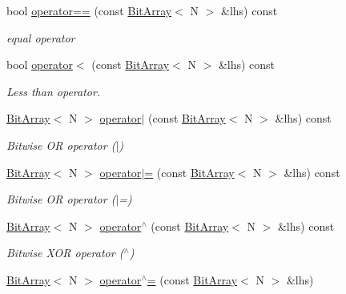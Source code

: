 \begin{DoxyCompactItemize}
bool \mbox{\hyperlink{classforte_1_1_bit_array_abe6a395fc267c35a66224344a43f2cb2}{operator==}} (const \mbox{\hyperlink{classforte_1_1_bit_array}{Bit\+Array}}$<$ N $>$ \&lhs) const
\begin{DoxyCompactList}\small\item\em equal operator \end{DoxyCompactList}\item 
bool \mbox{\hyperlink{classforte_1_1_bit_array_adce1757202af90d3a37ca08d32f0d778}{operator$<$}} (const \mbox{\hyperlink{classforte_1_1_bit_array}{Bit\+Array}}$<$ N $>$ \&lhs) const
\begin{DoxyCompactList}\small\item\em Less than operator. \end{DoxyCompactList}\item 
\mbox{\hyperlink{classforte_1_1_bit_array}{Bit\+Array}}$<$ N $>$ \mbox{\hyperlink{classforte_1_1_bit_array_a6a76d16ef5acbf96710ca3420dbd4be5}{operator$\vert$}} (const \mbox{\hyperlink{classforte_1_1_bit_array}{Bit\+Array}}$<$ N $>$ \&lhs) const
\begin{DoxyCompactList}\small\item\em Bitwise OR operator ($\vert$) \end{DoxyCompactList}\item 
\mbox{\hyperlink{classforte_1_1_bit_array}{Bit\+Array}}$<$ N $>$ \mbox{\hyperlink{classforte_1_1_bit_array_a64a5143b2b9e32399197546d239b6ac0}{operator$\vert$=}} (const \mbox{\hyperlink{classforte_1_1_bit_array}{Bit\+Array}}$<$ N $>$ \&lhs) const
\begin{DoxyCompactList}\small\item\em Bitwise OR operator ($\vert$=) \end{DoxyCompactList}\item 
\mbox{\hyperlink{classforte_1_1_bit_array}{Bit\+Array}}$<$ N $>$ \mbox{\hyperlink{classforte_1_1_bit_array_a3ec375f1cffe72e1e4a737ebc3e4880e}{operator$^\wedge$}} (const \mbox{\hyperlink{classforte_1_1_bit_array}{Bit\+Array}}$<$ N $>$ \&lhs) const
\begin{DoxyCompactList}\small\item\em Bitwise X\+OR operator ($^\wedge$) \end{DoxyCompactList}\item 
\mbox{\hyperlink{classforte_1_1_bit_array}{Bit\+Array}}$<$ N $>$ \mbox{\hyperlink{classforte_1_1_bit_array_a320cbd761b032de5797b95a08d27ac2f}{operator$^\wedge$=}} (const \mbox{\hyperlink{classforte_1_1_bit_array}{Bit\+Array}}$<$ N $>$ \&lhs)

\end{DoxyCompactItemize}
